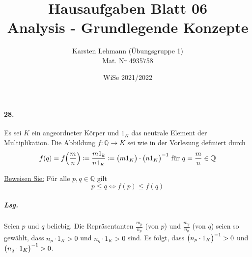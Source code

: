 \documentclass{scrreprt}
\author{Karsten Lehmann (Übungsgruppe 1)\\Mat. Nr 4935758}
\date{WiSe 2021/2022}
\title{Hausaufgaben Blatt 06\\Analysis - Grundlegende Konzepte}
\begin{document}
\paragraph{28.} Es sei $K$ ein angeordneter Körper und $1_K$ das neutrale Element
der Multiplikation.
Die Abbildung $f \colon \mathbb{Q} \to K$ sei wie in der Vorlesung definiert
durch
\[
  f(q) = f\qty(\frac{m}{n}) \coloneqq \frac{m1_k}{n1_K} \coloneqq
  \qty\big(m1_K) \cdot \qty\big(n1_K)^{-1}
  \text{ für } q = \frac{m}{n} \in \mathbb{Q}
\]

\underline{Beweisen Sie:} Für alle $p, q \in \mathbb{Q}$ gilt
\[
  p \leq q \iff f(p) \leq f(q)
\]

\subparagraph{Lsg.} Seien $p$ und $q$ beliebig.
Die Repräsentanten $\frac{m_p}{n_p}$ (von $p$) und $\frac{m_q}{n_q}$ (von $q$)
seien so gewählt, dass $n_p \cdot 1_K > 0$ und $n_q \cdot 1_K > 0$ sind.
Es folgt, dass $\qty\big(n_p \cdot 1_K)^{-1} > 0$ und
$\qty\big(n_q \cdot 1_K)^{-1} > 0$.

\end{document}
